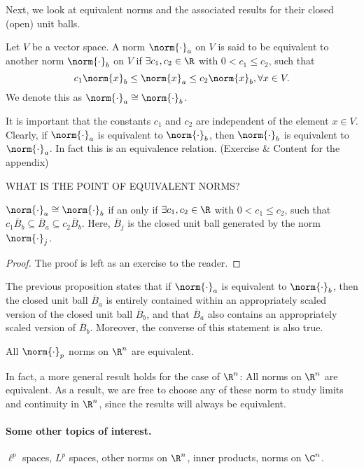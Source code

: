 \documentclass[draft]{penrose}
\newcommand{\cB}{\overline{B}}
\begin{document}
Next, we look at equivalent norms and the associated results for their closed (open) unit balls.

\begin{ndfn}
  Let $V$ be a vector space. A norm $\norm{\cdot}_a$ on $V$ is said to be equivalent to another norm $\norm{\cdot}_b$ on $V$ if $\exists c_1, c_2 \in \R$ with $0 < c_1 \leq c_2$, such that
  \begin{equation*}
    c_1 \norm{x}_b \leq \norm{x}_a \leq c_2 \norm{x}_b, \forall x \in V.
  \end{equation*}
  We denote this as $\norm{\cdot}_a \cong \norm{\cdot}_b$.
\end{ndfn}
It is important that the constants $c_1$ and $c_2$ are independent of the element $x \in V$. Clearly, if $\norm{\cdot}_a$ is equivalent to $\norm{\cdot}_b$, then $\norm{\cdot}_b$ is equivalent to $\norm{\cdot}_a$. In fact this is an equivalence relation. (Exercise \& Content for the appendix)

WHAT IS THE POINT OF EQUIVALENT NORMS?

\begin{nprop}
  $\norm{\cdot}_a \cong \norm{\cdot}_b$ if an only if $\exists c_1, c_2 \in \R$ with $0 < c_1 \leq c_2$, such that $c_1 \cB_b \subseteq \cB_a \subseteq c_2 \cB_b$. Here, $\cB_j$ is the closed unit ball generated by the norm $\norm{\cdot}_j$.
\end{nprop}
\begin{proof}
  The proof is left as an exercise to the reader.
\end{proof}

The previous proposition states that if $\norm{\cdot}_a$ is equivalent to $\norm{\cdot}_b$, then the closed unit ball $\cB_a$ is entirely contained within an appropriately scaled version of the closed unit ball $\cB_b$, and that $\cB_a$ also contains an appropriately scaled version of $\cB_b$. Moreover, the converse of this statement is also true.

\begin{nthm}
  All $\norm{\cdot}_p$ norms on $\R^n$ are equivalent.
\end{nthm}

In fact, a more general result holds for the case of $\R^n$: All norms on $\R^n$ are equivalent. As a result, we are free to choose any of these norm to study limits and continuity in $\R^n$, since the results will always be equivalent.

\paragraph{Some other topics of interest.} $\ell^p$ spaces, $L^p$ spaces, other norms on $\R^n$, inner products, norms on $\C^n$.
\end{document}
